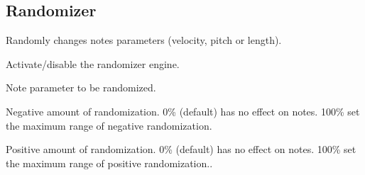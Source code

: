 \subsection{Randomizer}

Randomly changes notes parameters (velocity, pitch or length).


  

Activate/disable the randomizer engine.

    

Note parameter to be randomized.

  \btn{\ldots} 

Negative amount of randomization. 0\% (default) has no effect on notes. 100\% set the maximum range of negative randomization.

  \btn{\ldots} 

Positive amount of randomization. 0\% (default) has no effect on notes. 100\% set the maximum range of positive randomization..
